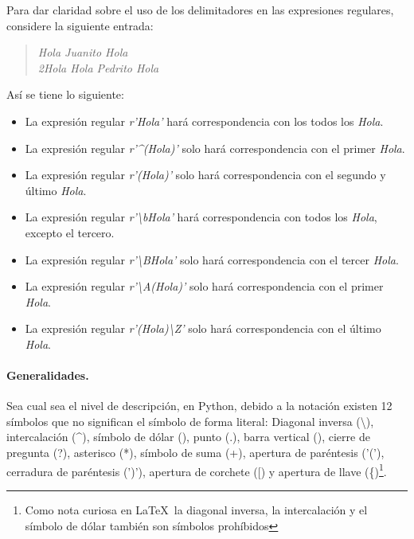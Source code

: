 Para dar claridad sobre el uso de los delimitadores en las expresiones regulares, considere la siguiente entrada:
\begin{quote}
	\textit{Hola Juanito Hola\\
	2Hola Hola Pedrito Hola}
\end{quote}
Así se tiene lo siguiente:
\begin{itemize}
	\item La expresión regular \textit{r'Hola'} hará correspondencia con los todos los \textit{Hola}.
	
	\item La expresión regular \textit{r'\textasciicircum(Hola)'} solo hará correspondencia con el primer \textit{Hola}.
	
	\item La expresión regular \textit{r'(Hola)\textdollar'} solo hará correspondencia con el segundo y último \textit{Hola}.
	
	\item La expresión regular \textit{r'\textbackslash{}bHola'} hará correspondencia con todos los \textit{Hola}, excepto el tercero.
	
	\item La expresión regular \textit{r'\textbackslash{}BHola'} solo hará correspondencia con el tercer \textit{Hola}.
	
	\item La expresión regular \textit{r'\textbackslash{}A(Hola)'} solo hará correspondencia con el primer \textit{Hola}.
	
	\item La expresión regular \textit{r'(Hola)\textbackslash{}Z'} solo hará correspondencia con el último \textit{Hola}.
	
\end{itemize}

 

\paragraph{Generalidades.} Sea cual sea el nivel de descripción, en Python, debido a la notación existen 12 símbolos que no significan el símbolo de forma literal: Diagonal inversa (\textbackslash), intercalación (\textasciicircum), símbolo de dólar (\textdollar), punto (.), barra vertical (\textpipe), cierre de pregunta (?), asterisco (*), símbolo de suma (+), apertura de paréntesis ('('), cerradura de paréntesis (')'), apertura de corchete ([)  y apertura de llave (\{)\footnote{Como nota curiosa en \LaTeX \ la diagonal inversa, la intercalación y el símbolo de dólar también son símbolos prohíbidos}.

